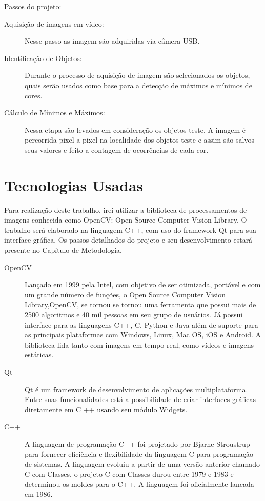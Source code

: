 	
	Passos do projeto:
	\begin{description}
		\item[Aquisição de imagens em vídeo:] Nesse passo as imagem são adquiridas via câmera USB.
		
		\item[Identificação de Objetos:]
				 Durante o processo de aquisição de imagem são selecionados os objetos, quais serão usados como base para a detecção de máximos e mínimos de cores.
		\item [Cálculo de Mínimos e Máximos:]
		 Nessa etapa são levados em consideração os objetos teste. A imagem é percorrida pixel a pixel na localidade dos objetos-teste e assim são salvos seus valores e feito a contagem de ocorrências de cada cor.		
	\end{description}

\section{Tecnologias Usadas}
Para realização deste trabalho, irei utilizar a biblioteca de processamentos de imagens conhecida como OpenCV: Open Source Computer Vision Library. O trabalho será elaborado na linguagem C++, com uso do framework Qt para sua interface gráfica.
Os passos detalhados do projeto e seu desenvolvimento estará presente no Capítulo de Metodologia.
\begin{description}
	\item[OpenCV] Lançado em 1999 pela Intel\cite{Culjak:2012}, com objetivo de ser otimizada, portável e com um grande número de funções, o Open Source Computer Vision Library,OpenCV, se tornou se tornou uma ferramenta que possui mais de 2500 algoritmos e 40 mil pessoas em seu grupo de usuários\cite{Culjak:2012}. Já possui interface para as linguagens C++, C, Python e Java além de suporte para as principais plataformas com Windows, Linux, Mac OS, iOS e Android. A biblioteca lida tanto com imagens em tempo real, como vídeos e imagens estáticas.
	
	\item[Qt] Qt é um framework de desenvolvimento de aplicações multiplataforma. Entre suas funcionalidades está a possibilidade de criar interfaces gráficas diretamente em C ++ usando seu módulo Widgets.
	
	\item [C++] A linguagem de programação C++ foi projetado por Bjarne Stroustrup para fornecer eficiência e flexibilidade da linguagem C para programação de sistemas. A linguagem evoluiu a partir de uma versão anterior chamado C com Classes, o projeto C com Classes durou entre 1979 e 1983 e determinou os moldes para o C++. A linguagem foi oficialmente lancada em 1986.\cite{Stroustrup:1996} 
\end{description}

